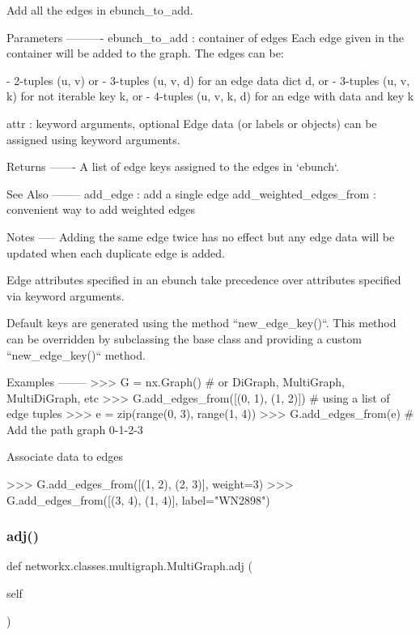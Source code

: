 \begin{DoxyVerb}Add all the edges in ebunch_to_add.

Parameters
----------
ebunch_to_add : container of edges
    Each edge given in the container will be added to the
    graph. The edges can be:

- 2-tuples (u, v) or
- 3-tuples (u, v, d) for an edge data dict d, or
- 3-tuples (u, v, k) for not iterable key k, or
- 4-tuples (u, v, k, d) for an edge with data and key k

attr : keyword arguments, optional
    Edge data (or labels or objects) can be assigned using
    keyword arguments.

Returns
-------
A list of edge keys assigned to the edges in `ebunch`.

See Also
--------
add_edge : add a single edge
add_weighted_edges_from : convenient way to add weighted edges

Notes
-----
Adding the same edge twice has no effect but any edge data
will be updated when each duplicate edge is added.

Edge attributes specified in an ebunch take precedence over
attributes specified via keyword arguments.

Default keys are generated using the method ``new_edge_key()``.
This method can be overridden by subclassing the base class and
providing a custom ``new_edge_key()`` method.

Examples
--------
>>> G = nx.Graph()  # or DiGraph, MultiGraph, MultiDiGraph, etc
>>> G.add_edges_from([(0, 1), (1, 2)])  # using a list of edge tuples
>>> e = zip(range(0, 3), range(1, 4))
>>> G.add_edges_from(e)  # Add the path graph 0-1-2-3

Associate data to edges

>>> G.add_edges_from([(1, 2), (2, 3)], weight=3)
>>> G.add_edges_from([(3, 4), (1, 4)], label="WN2898")
\end{DoxyVerb}
 \mbox{\label{classnetworkx_1_1classes_1_1multigraph_1_1MultiGraph_a6242012627ea0cf734c57d93182eb10b}} 
\subsubsection{\texorpdfstring{adj()}{adj()}}
{\footnotesize\ttfamily def networkx.\+classes.\+multigraph.\+Multi\+Graph.\+adj (\begin{DoxyParamCaption}\item[{}]{self }\end{DoxyParamCaption})}

